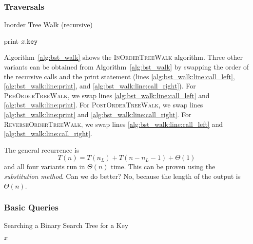 \subsubsection{Traversals}
\begin{algorithm}[htb]
  \caption{Inorder Tree Walk (recursive)}
  \label{alg:bst_walk}
  \begin{algorithmic}[1]
        \State {} \label{alg:bst_walk:line:call_left}
        \State print \(x\mathtt{.}\mathtt{key}\) \label{alg:bst_walk:line:print}
        \State {} \label{alg:bst_walk:line:call_right}
      \EndIf
    \EndFunction
  \end{algorithmic}
\end{algorithm}

Algorithm~\ref{alg:bst_walk} shows the \textsc{InOrderTreeWalk} algorithm.
Three other variants can be obtained from Algorithm~\ref{alg:bst_walk} by swapping the order of the recursive calls and the print statement (lines \ref{alg:bst_walk:line:call_left}, \ref{alg:bst_walk:line:print}, and \ref{alg:bst_walk:line:call_right}).
For \textsc{PreOrderTreeWalk}, we swap lines \ref{alg:bst_walk:line:call_left} and \ref{alg:bst_walk:line:print}.
For \textsc{PostOrderTreeWalk}, we swap lines \ref{alg:bst_walk:line:print} and \ref{alg:bst_walk:line:call_right}.
For \textsc{ReverseOrderTreeWalk}, we swap lines \ref{alg:bst_walk:line:call_left} and \ref{alg:bst_walk:line:call_right}.

The general recurrence is 
\[
T(n) = T(n_L) + T(n - n_L - 1) + \Theta(1)
\]
and all four variants run in \(\Theta(n)\) time. 
This can be proven using the \emph{substitution method}.
Can we do better? No, because the length of the output is \(\Theta(n)\).

\subsubsection{Basic Queries}

\begin{algorithm}[htb]
  \caption{Searching a Binary Search Tree for a Key}
  \label{alg:bst_search}
  \begin{algorithmic}[1]
        \State \Return $x$ 
      \EndIf
        \State \Return {}
      \Else
        \State \Return {}
      \EndIf
    \EndFunction
  \end{algorithmic}
\end{algorithm}


